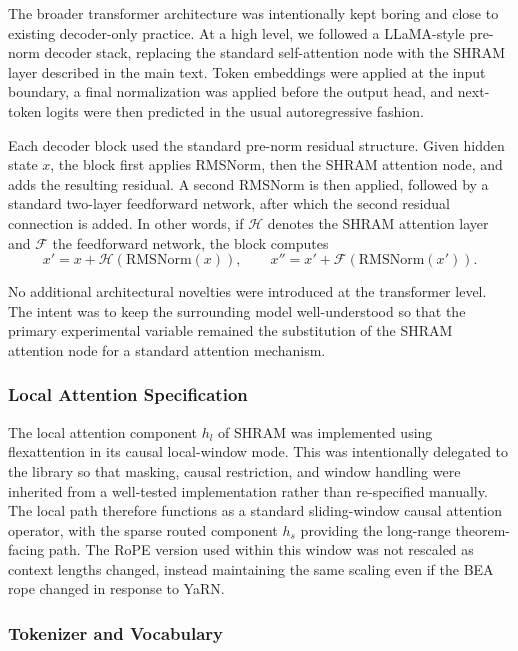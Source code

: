 \documentclass[11pt]{article}
\begin{document}
The broader transformer architecture was intentionally kept boring and close to existing decoder-only practice. At a high level, we followed a LLaMA-style pre-norm decoder stack, replacing the standard self-attention node with the SHRAM layer described in the main text. Token embeddings were applied at the input boundary, a final normalization was applied before the output head, and next-token logits were then predicted in the usual autoregressive fashion.

Each decoder block used the standard pre-norm residual structure. Given hidden state $x$, the block first applies RMSNorm, then the SHRAM attention node, and adds the resulting residual. A second RMSNorm is then applied, followed by a standard two-layer feedforward network, after which the second residual connection is added. In other words, if $\mathcal{H}$ denotes the SHRAM attention layer and $\mathcal{F}$ the feedforward network, the block computes
\[
x' = x + \mathcal{H}(\mathrm{RMSNorm}(x)),
\qquad
x'' = x' + \mathcal{F}(\mathrm{RMSNorm}(x')).
\]

No additional architectural novelties were introduced at the transformer level. The intent was to keep the surrounding model well-understood so that the primary experimental variable remained the substitution of the SHRAM attention node for a standard attention mechanism.

\subsubsection{Local Attention Specification}
\label{app:local_attention}

The local attention component $h_l$ of SHRAM was implemented using flexattention in its causal local-window mode. This was intentionally delegated to the library so that masking, causal restriction, and window handling were inherited from a well-tested implementation rather than re-specified manually. The local path therefore functions as a standard sliding-window causal attention operator, with the sparse routed component $h_s$ providing the long-range theorem-facing path. The RoPE version used within this window was not rescaled as context lengths changed, instead maintaining the same scaling even if the BEA rope changed in response to YaRN.



\subsubsection{Tokenizer and Vocabulary}
\label{app:tokenizer}
\end{document}

